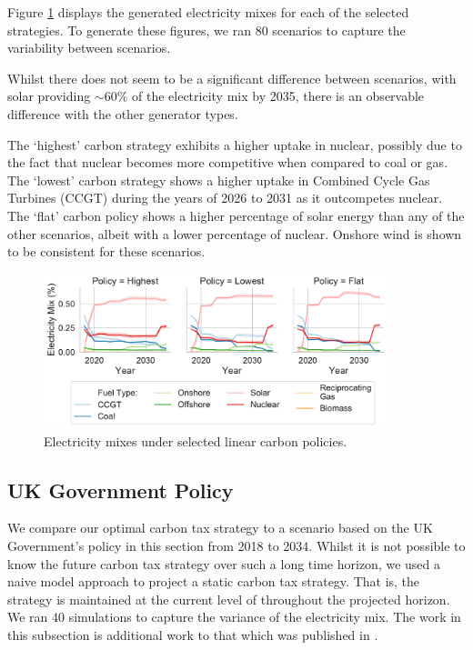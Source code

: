 Figure \ref{fig:best_electricity_mixes_facet} displays the generated electricity mixes for each of the selected strategies. To generate these figures, we ran 80 scenarios to capture the variability between scenarios. 

Whilst there does not seem to be a significant difference between scenarios, with solar providing ${\sim}60\%$ of the electricity mix by 2035, there is an observable difference with the other generator types.

The `highest' carbon strategy exhibits a higher uptake in nuclear, possibly due to the fact that nuclear becomes more competitive when compared to coal or gas. The `lowest' carbon strategy shows a higher uptake in Combined Cycle Gas Turbines (CCGT) during the years of 2026 to 2031 as it outcompetes nuclear. The `flat' carbon policy shows a higher percentage of solar energy than any of the other scenarios, albeit with a lower percentage of nuclear. Onshore wind is shown to be consistent for these scenarios.

\begin{figure}
	\centering
	\includegraphics[width=0.9\textwidth]{Chapter6/figures/results/best_electricity_mixes_facet}
	\caption{Electricity mixes under selected linear carbon policies.}
	\label{fig:best_electricity_mixes_facet}
\end{figure}


\subsection{UK Government Policy}

We compare our optimal carbon tax strategy to a scenario based on the UK Government's policy in this section from 2018 to 2034. Whilst it is not possible to know the future carbon tax strategy over such a long time horizon, we used a naive model approach to project a static carbon tax strategy. That is, the strategy is maintained at the current level of  throughout the projected horizon. We ran 40 simulations to capture the variance of the electricity mix. The work in this subsection is additional work to that which was published in \cite{Kell2020a}.

